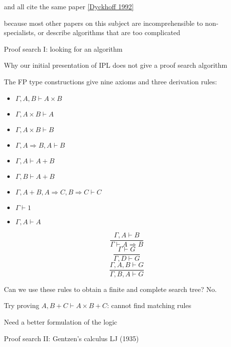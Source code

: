 and all cite the same paper {\footnotesize{}\href{https://rd.host.cs.st-andrews.ac.uk/publications/jsl57.pdf}{[Dyckhoff 1992]}}{\footnotesize\par}

because most other papers on this subject are incomprehensible to
non-specialists, or describe algorithms that are too complicated

Proof search I: looking for an algorithm

Why our initial presentation of IPL does not give a proof search algorithm

The FP type constructions give nine axioms and three derivation rules:

\begin{minipage}[t]{0.49\columnwidth}%
\begin{itemize}
\item $\Gamma,A,B\vdash A\times B$ 
\item $\Gamma,A\times B\vdash A$ 
\item $\Gamma,A\times B\vdash B$
\item $\Gamma,A\Rightarrow B,A\vdash B$
\item $\Gamma,A\vdash A+B$ 
\item $\Gamma,B\vdash A+B$
\item $\Gamma,A+B,A\Rightarrow C,B\Rightarrow C\vdash C$
\item $\Gamma\vdash1$
\item $\Gamma,A\vdash A$
\end{itemize}
%
\end{minipage}%
\begin{minipage}[t]{0.49\columnwidth}%
\[
\frac{\Gamma,A\vdash B}{\Gamma\vdash A\Rightarrow B}
\]
\[
\frac{\Gamma\vdash G}{\Gamma,D\vdash G}
\]
\[
\frac{\Gamma,A,B\vdash G}{\Gamma,B,A\vdash G}
\]
%
\end{minipage}

\medskip{}
Can we use these rules to obtain a finite and complete search tree?
No.

Try proving $A,B+C\vdash A\times B+C$: cannot find matching rules

Need a better formulation of the logic

Proof search II: Gentzen's calculus LJ (1935)

